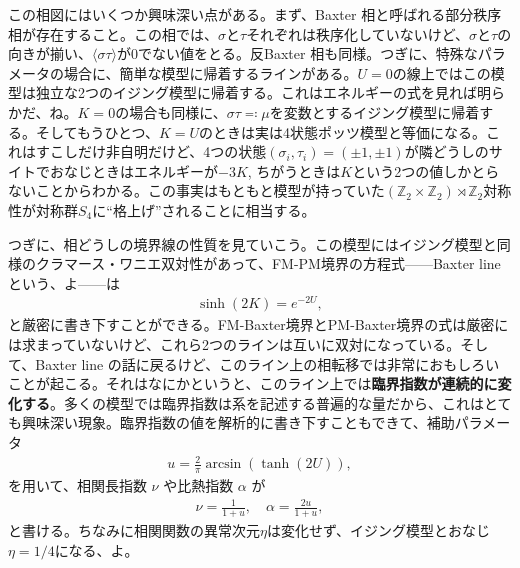 \documentclass[paper=b5j,fontsize=12Q,jafontsize=12Q,baselineskip=21Q]{jlreq}
\begin{document}
\begin{refsection}

この相図にはいくつか興味深い点がある。まず、Baxter 相と呼ばれる部分秩序相が存在すること。この相では、$\sigma$と$\tau$それぞれは秩序化していないけど、$\sigma$と$\tau$の向きが揃い、$\langle\sigma\tau\rangle$が0でない値をとる。反Baxter 相も同様。つぎに、特殊なパラメータの場合に、簡単な模型に帰着するラインがある。$U=0$の線上ではこの模型は独立な2つのイジング模型に帰着する。これはエネルギーの式を見れば明らかだ、ね。$K=0$の場合も同様に、$\sigma\tau\eqqcolon\mu$を変数とするイジング模型に帰着する。そしてもうひとつ、$K=U$のときは実は4状態ポッツ模型と等価になる。これはすこしだけ非自明だけど、4つの状態$(\sigma_i,\tau_i)=(\pm1,\pm1)$が隣どうしのサイトでおなじときはエネルギーが$-3K$, ちがうときは$K$という2つの値しかとらないことからわかる。この事実はもともと模型が持っていた$(\mathbb Z_2\times\mathbb Z_2)\rtimes\mathbb Z_2$対称性が対称群$S_4$に``格上げ''されることに相当する。

つぎに、相どうしの境界線の性質を見ていこう。この模型にはイジング模型と同様のクラマース・ワニエ双対性があって、FM-PM境界の方程式------Baxter line という、よ------は
\begin{align}
  \sinh(2K)=e^{-2U},\label{eq:baxter_line}
\end{align}
と厳密に書き下すことができる。FM-Baxter境界とPM-Baxter境界の式は厳密には求まっていないけど、これら2つのラインは互いに双対になっている。そして、Baxter line の話に戻るけど、このライン上の相転移では非常におもしろいことが起こる。それはなにかというと、このライン上では\textbf{臨界指数が連続的に変化する}。多くの模型では臨界指数は系を記述する普遍的な量だから、これはとても興味深い現象。臨界指数の値を解析的に書き下すこともできて、補助パラメータ
\begin{align}
  u = \frac{2}{\pi} \arcsin(\tanh(2U)),
\end{align}
を用いて、相関長指数 $\nu$ や比熱指数 $\alpha$ が
\begin{align}
  \nu = \frac{1}{1 + u},\quad \alpha = \frac{2u}{1 + u},
\end{align}
と書ける。ちなみに相関関数の異常次元$\eta$は変化せず、イジング模型とおなじ$\eta=1/4$になる、よ。


\end{refsection}
\end{document}
